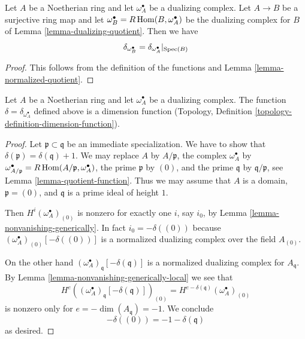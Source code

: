 \begin{lemma}
\label{lemma-quotient-function}
Let $A$ be a Noetherian ring and let $\omega_A^\bullet$ be a dualizing
complex. Let $A \to B$ be a surjective ring map and let
$\omega_B^\bullet = R\mathop{\mathrm{Hom}}\nolimits(B, \omega_A^\bullet)$ be the dualizing
complex for $B$ of Lemma \ref{lemma-dualizing-quotient}. Then we have
$$
\delta_{\omega_B^\bullet} = \delta_{\omega_A^\bullet}|_{\mathop{\mathrm{Spec}}(B)}
$$
\end{lemma}

\begin{proof}
This follows from the definition of the functions and
Lemma \ref{lemma-normalized-quotient}.
\end{proof}

\begin{lemma}
\label{lemma-dimension-function}
Let $A$ be a Noetherian ring and let $\omega_A^\bullet$ be a dualizing
complex. The function $\delta = \delta_{\omega_A^\bullet}$
defined above is a dimension function
(Topology, Definition \ref{topology-definition-dimension-function}).
\end{lemma}

\begin{proof}
Let $\mathfrak p \subset \mathfrak q$ be an immediate specialization.
We have to show that $\delta(\mathfrak p) = \delta(\mathfrak q) + 1$.
We may replace $A$ by $A/\mathfrak p$, the complex $\omega_A^\bullet$ by
$\omega_{A/\mathfrak p}^\bullet = R\mathop{\mathrm{Hom}}\nolimits(A/\mathfrak p, \omega_A^\bullet)$,
the prime $\mathfrak p$ by $(0)$, and the prime $\mathfrak q$
by $\mathfrak q/\mathfrak p$,
see Lemma \ref{lemma-quotient-function}. Thus we may assume that
$A$ is a domain, $\mathfrak p = (0)$, and $\mathfrak q$ is a prime
ideal of height $1$.

\medskip\noindent
Then $H^i(\omega_A^\bullet)_{(0)}$ is nonzero
for exactly one $i$, say $i_0$, by Lemma \ref{lemma-nonvanishing-generically}.
In fact $i_0 = -\delta((0))$ because
$(\omega_A^\bullet)_{(0)}[-\delta((0))]$
is a normalized dualizing complex over the field $A_{(0)}$.

\medskip\noindent
On the other hand $(\omega_A^\bullet)_\mathfrak q[-\delta(\mathfrak q)]$
is a normalized dualizing complex for $A_\mathfrak q$. By
Lemma \ref{lemma-nonvanishing-generically-local}
we see that
$$
H^e((\omega_A^\bullet)_\mathfrak q[-\delta(\mathfrak q)])_{(0)} =
H^{e - \delta(\mathfrak q)}(\omega_A^\bullet)_{(0)}
$$
is nonzero only for $e = -\dim(A_\mathfrak q) = -1$.
We conclude
$$
-\delta((0)) = -1 - \delta(\mathfrak q)
$$
as desired.
\end{proof}

